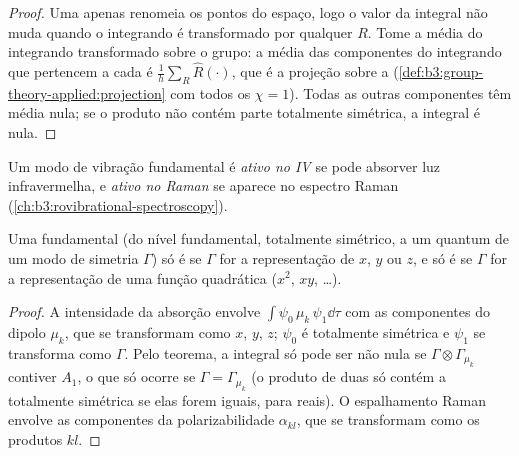 \begin{proof}
Uma  apenas renomeia os pontos do espaço, logo o valor da
integral não muda quando o integrando é transformado por qualquer $R$. Tome a
média do integrando transformado sobre o grupo: a média das componentes do
integrando que pertencem a cada  é
$\frac1h\sum_R\hat R(\cdot)$, que é a projeção sobre a  (\cref{def:b3:group-theory-applied:projection} com todos os
$\chi = 1$). Todas as outras componentes têm média nula; se o produto não contém
parte totalmente simétrica, a integral é nula.
\end{proof}

\begin{definition}\label{def:b3:group-theory-applied:activity}
Um modo de vibração fundamental é \emph{ativo no IV} se pode
absorver luz infravermelha, e \emph{ativo no Raman} se aparece
no espectro Raman (\cref{ch:b3:rovibrational-spectroscopy}).
\end{definition}

\begin{corollary}\label{cor:b3:group-theory-applied:ir-raman}
Uma fundamental (do nível fundamental, totalmente simétrico, a um quantum
de um modo de simetria $\Gamma$) só é  se $\Gamma$ for a
representação de $x$, $y$ ou $z$, e só é  se $\Gamma$ for a
representação de uma função quadrática ($x^2$, $xy$, \dots).
\end{corollary}

\begin{proof}
A intensidade da absorção envolve $\int\psi_0\,\mu_k\,\psi_1\dd\tau$ com as
componentes do dipolo $\mu_k$, que se transformam como $x$, $y$, $z$; $\psi_0$ é
totalmente simétrica e $\psi_1$ se transforma como $\Gamma$. Pelo teorema, a integral
só pode ser não nula se $\Gamma\otimes\Gamma_{\mu_k}$ contiver $A_1$, o que só ocorre se $\Gamma =
\Gamma_{\mu_k}$ (o produto de duas  só contém a
totalmente simétrica se elas forem iguais, para  reais). O
espalhamento Raman envolve as componentes da polarizabilidade $\alpha_{kl}$, que
se transformam como os produtos $kl$.
\end{proof}

